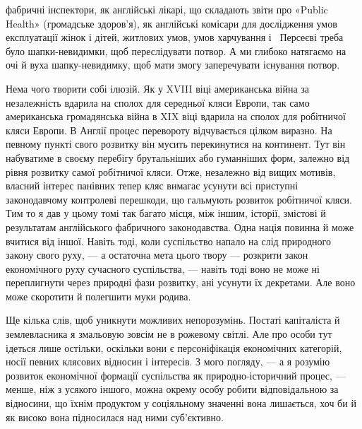 \parcont{}  %
фабричні інспектори, як англійські лікарі, що складають звіти
про «Public Health» (громадське здоров’я), як англійські комісари
для дослідження умов експлуатації жінок і дітей, житлових
умов, умов харчування і~ Персеєві треба було шапки-невидимки,
щоб переслідувати потвор. А ми глибоко натягаємо на очі
й вуха шапку-невидимку, щоб мати змогу заперечувати існування
потвор.

Нема чого творити собі ілюзій. Як у XVIII віці американська
війна за незалежність вдарила на сполох для середньої кляси
Европи, так само американська громадянська війна в XIX віці
вдарила на сполох для робітничої кляси Европи. В Англії процес
перевороту відчувається цілком виразно. На певному пункті свого
розвитку він мусить перекинутися на континент. Тут він набуватиме
в своєму перебігу брутальніших або гуманніших форм, залежно
від рівня розвитку самої робітничої кляси. Отже, незалежно
від вищих мотивів, власний інтерес панівних тепер кляс вимагає
усунути всі приступні законодавчому контролеві перешкоди, що
гальмують розвиток робітничої кляси. Тим то я дав у цьому
томі так багато місця, між іншим, історії, змістові й результатам
англійського фабричного законодавства. Одна нація повинна й
може вчитися від іншої. Навіть тоді, коли суспільство напало на
слід природного закону свого руху, — а остаточна мета цього
твору — розкрити закон економічного руху сучасного суспільства,
— навіть тоді воно не може ні переплигнути через природні
фази розвитку, ані усунути їх декретами. Але воно може скоротити
й полегшити муки родива.

Ще кілька слів, щоб уникнути можливих непорозумінь. Постаті
капіталіста й землевласника я змальовую зовсім не в рожевому
світлі. Але про особи тут ідеться лише остільки, оскільки вони є
персоніфікація економічних категорій, носії певних клясових
відносин і інтересів. З мого погляду, — а я розумію розвиток економічної
формації суспільства як природно-історичний процес, —
менше, ніж з усякого іншого, можна окрему особу робити відповідальною
за відносини, що їхнім продуктом у соціяльному значенні
вона лишається, хоч би й як високо вона підносилася над
ними суб’єктивно.

